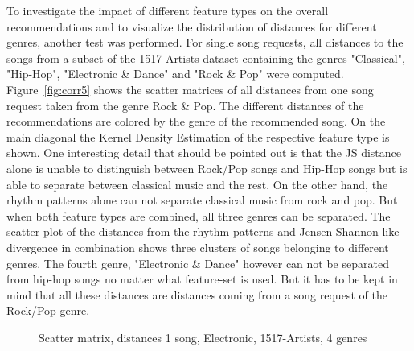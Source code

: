\noindent To investigate the impact of different feature types on the overall recommendations and to visualize the distribution of distances for different genres, another test was performed. For single song requests, all distances to the songs from a subset of the 1517-Artists dataset containing the genres "Classical", "Hip-Hop", "Electronic \& Dance" and "Rock \& Pop" were computed. Figure~\ref{fig:corr5} shows the scatter matrices of all distances from one song request taken from the genre Rock \& Pop. The different distances of the recommendations are colored by the genre of the recommended song. 
\noindent On the main diagonal the Kernel Density Estimation of the respective feature type is shown. One interesting detail that should be pointed out is that the JS distance alone is unable to distinguish between Rock/Pop songs and Hip-Hop songs but is able to separate between classical music and the rest. On the other hand, the rhythm patterns alone can not separate classical music from rock and pop. But when both feature types are combined, all three genres can be separated. The scatter plot of the distances from the rhythm patterns and Jensen-Shannon-like divergence in combination shows three clusters of songs belonging to different genres. The fourth genre, "Electronic \& Dance" however can not be separated from hip-hop songs no matter what feature-set is used. But it has to be kept in mind that all these distances are distances coming from a song request of the Rock/Pop genre. 

\begin{figure}[htbp]
	\centering
	\caption{Scatter matrix, distances 1 song, Electronic, 1517-Artists, 4 genres}
	\label{fig:corr6}
\end{figure}
\FloatBarrier

